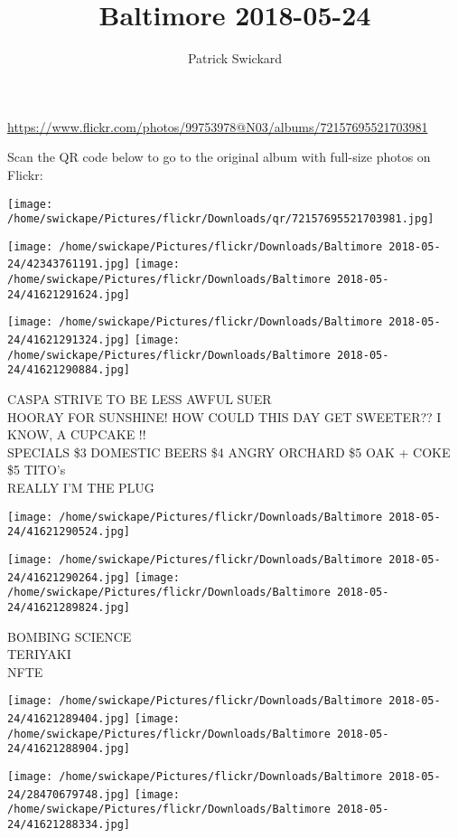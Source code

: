 \documentclass[10pt,letterpaper]{article}
\title{Baltimore 2018-05-24}
\author{Patrick Swickard}
\date{}
\begin{document}
\maketitle

\url{https://www.flickr.com/photos/99753978@N03/albums/72157695521703981}

Scan the QR code below to go to the original album with full-size photos on Flickr:

\texttt{[image: /home/swickape/Pictures/flickr/Downloads/qr/72157695521703981.jpg]}
\pagebreak

\texttt{[image: /home/swickape/Pictures/flickr/Downloads/Baltimore 2018-05-24/42343761191.jpg]}
\texttt{[image: /home/swickape/Pictures/flickr/Downloads/Baltimore 2018-05-24/41621291624.jpg]}

\texttt{[image: /home/swickape/Pictures/flickr/Downloads/Baltimore 2018-05-24/41621291324.jpg]}
\texttt{[image: /home/swickape/Pictures/flickr/Downloads/Baltimore 2018-05-24/41621290884.jpg]}

CASPA STRIVE TO BE LESS AWFUL SUER\\
HOORAY FOR SUNSHINE!  HOW COULD THIS DAY GET SWEETER??  I KNOW, A CUPCAKE !!\\
SPECIALS \$3 DOMESTIC BEERS \$4 ANGRY ORCHARD \$5 OAK + COKE \$5 TITO's\\
REALLY I'M THE PLUG
\pagebreak

\texttt{[image: /home/swickape/Pictures/flickr/Downloads/Baltimore 2018-05-24/41621290524.jpg]}

\vspace{0.25in}
\texttt{[image: /home/swickape/Pictures/flickr/Downloads/Baltimore 2018-05-24/41621290264.jpg]}
\texttt{[image: /home/swickape/Pictures/flickr/Downloads/Baltimore 2018-05-24/41621289824.jpg]}

BOMBING SCIENCE\\
TERIYAKI\\
NFTE
\pagebreak

\texttt{[image: /home/swickape/Pictures/flickr/Downloads/Baltimore 2018-05-24/41621289404.jpg]}
\texttt{[image: /home/swickape/Pictures/flickr/Downloads/Baltimore 2018-05-24/41621288904.jpg]}

\texttt{[image: /home/swickape/Pictures/flickr/Downloads/Baltimore 2018-05-24/28470679748.jpg]}
\texttt{[image: /home/swickape/Pictures/flickr/Downloads/Baltimore 2018-05-24/41621288334.jpg]}
\end{document}
